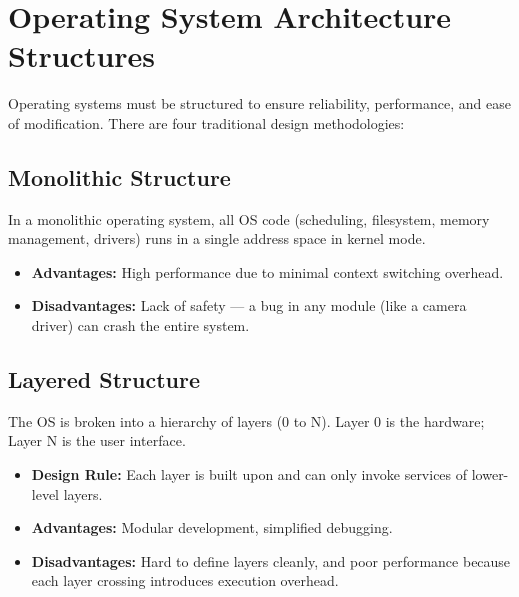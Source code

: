 \documentclass[12pt,a4paper]{article}
\begin{document}
\section{Operating System Architecture Structures}

Operating systems must be structured to ensure reliability, performance, and ease of modification. There are four traditional design methodologies:

\subsection{Monolithic Structure}
In a monolithic operating system, all OS code (scheduling, filesystem, memory management, drivers) runs in a single address space in kernel mode.
\begin{itemize}[leftmargin=*, itemsep=3pt]
  \item \textbf{Advantages:} High performance due to minimal context switching overhead.
  \item \textbf{Disadvantages:} Lack of safety --- a bug in any module (like a camera driver) can crash the entire system.
\end{itemize}

\subsection{Layered Structure}
The OS is broken into a hierarchy of layers (0 to N). Layer 0 is the hardware; Layer N is the user interface.
\begin{itemize}[leftmargin=*, itemsep=3pt]
  \item \textbf{Design Rule:} Each layer is built upon and can only invoke services of lower-level layers.
  \item \textbf{Advantages:} Modular development, simplified debugging.
  \item \textbf{Disadvantages:} Hard to define layers cleanly, and poor performance because each layer crossing introduces execution overhead.
\end{itemize}
\end{document}
